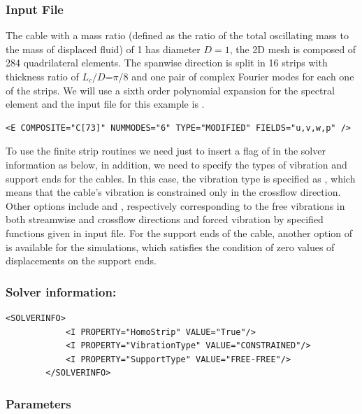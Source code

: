 \subsubsection{Input File}

The cable with a mass ratio (defined as the ratio of the total oscillating mass to the mass of displaced fluid) of 1 has diameter $D=1$, the 2D mesh is composed of 284 quadrilateral elements. The spanwise direction is split in 16 strips with thickness ratio of $L_c/D$=$\pi$/8 and one pair of complex Fourier modes for each one of the strips. We will use a sixth order polynomial expansion for the spectral element and the input file for this example is .



\begin{lstlisting}[style=XMLStyle]
<E COMPOSITE="C[73]" NUMMODES="6" TYPE="MODIFIED" FIELDS="u,v,w,p" />
\end{lstlisting}

To use the finite strip routines we need just to insert a flag of  in the solver information as below, in addition, we need to specify the types of vibration and support ends for the cables. In this case, the vibration type is specified as , which means that the cable's vibration is constrained only in the crossflow direction. Other options include  and , respectively corresponding to the free vibrations in both streamwise and crossflow directions and forced vibration by specified functions given in input file. For the support ends of the cable, another option of  is available for the simulations, which satisfies the condition of zero values of displacements on the support ends.

\subsubsection{Solver information:~}
\begin{lstlisting}[style=XMLStyle]
        <SOLVERINFO>
            <I PROPERTY="HomoStrip" VALUE="True"/>
            <I PROPERTY="VibrationType" VALUE="CONSTRAINED"/>
            <I PROPERTY="SupportType" VALUE="FREE-FREE"/>
        </SOLVERINFO>
\end{lstlisting}
        
\subsubsection{Parameters}

